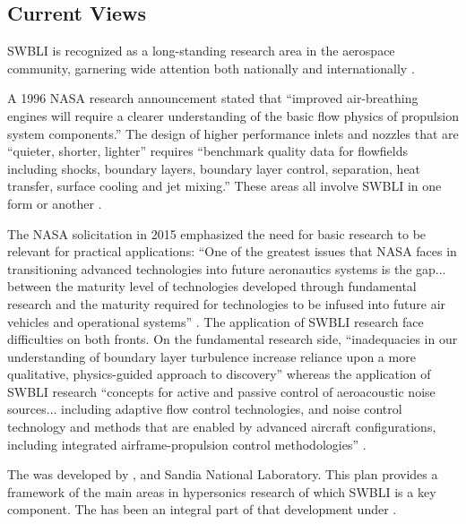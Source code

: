 \subsection{Current Views}
SWBLI is recognized as a long-standing research area in the aerospace community, garnering wide attention both nationally and internationally \cite{Gaitonde2013}.

A 1996 NASA research announcement stated that \enquote{improved air-breathing engines will require a clearer understanding of the basic flow physics of propulsion system components.} The design of higher performance inlets and nozzles that are \enquote{quieter, shorter, lighter} requires \enquote{benchmark quality data for flowfields including shocks, boundary layers, boundary layer control, separation, heat transfer, surface cooling and jet mixing.} These areas all involve SWBLI in one form or another \cite{Dolling2001}.

The NASA  solicitation in 2015 emphasized the need for basic research to be relevant for practical applications: \enquote{One of the greatest issues that NASA faces in transitioning advanced technologies into future aeronautics systems is the gap... between the maturity level of technologies developed through fundamental research and the maturity required for technologies to be infused into future air vehicles and operational systems} \cite{NASA2015}. The application of SWBLI research face difficulties on both fronts. On the fundamental research side, \enquote{inadequacies in our understanding of boundary layer turbulence increase reliance upon a more qualitative, physics-guided approach to discovery} \cite{NASA2008} whereas the application of SWBLI research \enquote{concepts for active and passive control of aeroacoustic noise sources... including adaptive flow control technologies, and noise control technology and methods that are enabled by advanced aircraft configurations, including integrated airframe-propulsion control methodologies} \cite{NASA2015}.

The  was developed by ,  and Sandia National Laboratory. This plan provides a framework of the main areas in hypersonics research of which SWBLI is a key component. The  has been an integral part of that development under  \cite{Schmisseur2013}.


